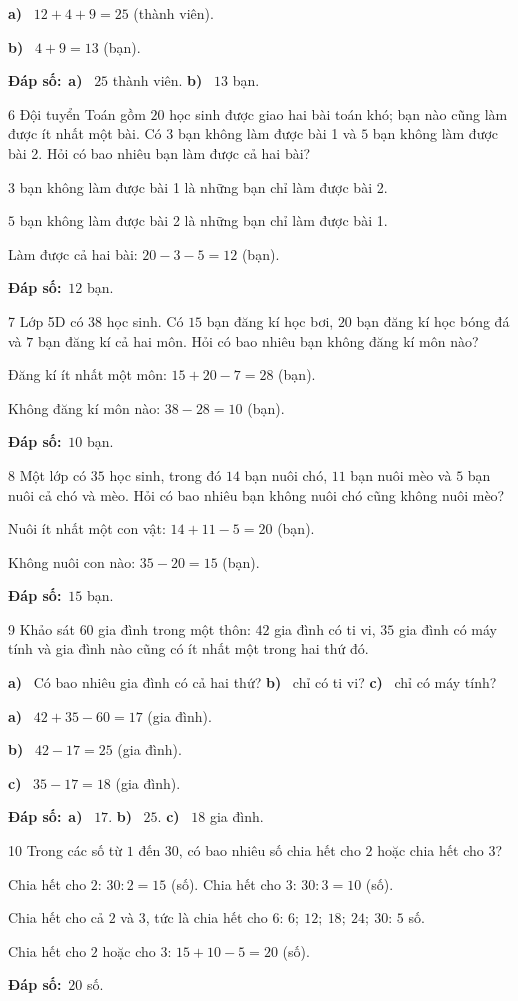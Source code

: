 \documentclass[11pt]{article}
\newif\ifsol \solfalse
\providecommand{\AnsWord}{Đáp số}
\newcommand{\dapso}[1]{\par\textbf{\AnsWord:}\ #1}
\newcommand{\probsol}[1]{%
  \begin{lrbox}{\solmeasure}\begin{minipage}{\dimexpr\linewidth-24pt\relax}#1\end{minipage}\end{lrbox}%
  \ifsol
    \begin{solbox}#1\end{solbox}%
  \else
    \setlength{\solht}{\dimexpr\ht\solmeasure+\dp\solmeasure+0.85cm\relax}%
    \ifdim\solht<1.35cm\setlength{\solht}{1.35cm}\fi
    \begin{tcolorbox}[colback=white,colframe=Line,boxrule=0.8pt,arc=5pt,
      left=8pt,right=8pt,top=4pt,bottom=4pt,height=\solht]{\footnotesize\color{Slate}\itshape\WorkWord}\end{tcolorbox}%
  \fi}
\newcommand{\pa}[1]{\textbf{#1)}\ }
\newcommand{\gap}{\vspace{0.3cm}}
\def\WorkWord{Bài làm:}
\def\AnsWord{Đáp số}
\begin{document}
\probsol{
\pa{a} $12+4+9=25$ (thành viên).\par
\pa{b} $4+9=13$ (bạn).
\dapso{\pa{a} $25$ thành viên. \pa{b} $13$ bạn.}}
\gap
\begin{probbox}{6}{\relax}
Đội tuyển Toán gồm $20$ học sinh được giao hai bài toán khó; bạn nào cũng làm được ít nhất một bài. Có $3$ bạn không làm được bài 1 và $5$ bạn không làm được bài 2. Hỏi có bao nhiêu bạn làm được cả hai bài?
\end{probbox}
\probsol{
$3$ bạn không làm được bài 1 là những bạn chỉ làm được bài 2.\par $5$ bạn không làm được bài 2 là những bạn chỉ làm được bài 1.\par
Làm được cả hai bài: $20-3-5=12$ (bạn).
\dapso{$12$ bạn.}}
\gap
\begin{probbox}{7}{\relax}
Lớp 5D có $38$ học sinh. Có $15$ bạn đăng kí học bơi, $20$ bạn đăng kí học bóng đá và $7$ bạn đăng kí cả hai môn. Hỏi có bao nhiêu bạn không đăng kí môn nào?
\end{probbox}
\probsol{
Đăng kí ít nhất một môn: $15+20-7=28$ (bạn).\par Không đăng kí môn nào: $38-28=10$ (bạn).
\dapso{$10$ bạn.}}
\gap
\begin{probbox}{8}{\relax}
Một lớp có $35$ học sinh, trong đó $14$ bạn nuôi chó, $11$ bạn nuôi mèo và $5$ bạn nuôi cả chó và mèo. Hỏi có bao nhiêu bạn không nuôi chó cũng không nuôi mèo?
\end{probbox}
\probsol{
Nuôi ít nhất một con vật: $14+11-5=20$ (bạn).\par Không nuôi con nào: $35-20=15$ (bạn).
\dapso{$15$ bạn.}}
\gap
\begin{probbox}{9}{\relax}
Khảo sát $60$ gia đình trong một thôn: $42$ gia đình có ti vi, $35$ gia đình có máy tính và gia đình nào cũng có ít nhất một trong hai thứ đó.\par
\pa{a} Có bao nhiêu gia đình có cả hai thứ? \quad \pa{b} chỉ có ti vi? \quad \pa{c} chỉ có máy tính?
\end{probbox}
\probsol{
\pa{a} $42+35-60=17$ (gia đình).\par
\pa{b} $42-17=25$ (gia đình).\par
\pa{c} $35-17=18$ (gia đình).
\dapso{\pa{a} $17$. \pa{b} $25$. \pa{c} $18$ gia đình.}}
\gap
\begin{probbox}{10}{\relax}
Trong các số từ $1$ đến $30$, có bao nhiêu số chia hết cho $2$ hoặc chia hết cho $3$?
\end{probbox}
\probsol{
Chia hết cho $2$: $30:2=15$ (số). Chia hết cho $3$: $30:3=10$ (số).\par
Chia hết cho cả $2$ và $3$, tức là chia hết cho $6$: $6;\ 12;\ 18;\ 24;\ 30$: $5$ số.
\begin{center}
\stpVennII{Chia hết cho $2$}{Chia hết cho $3$}{$10$}{$5$}{$5$}{}
\end{center}
Chia hết cho $2$ hoặc cho $3$: $15+10-5=20$ (số).
\dapso{$20$ số.}}
\end{document}
